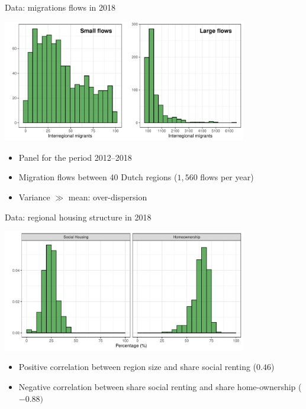 \documentclass{beamer}
\begin{document}
\begin{frame}{Data: migrations flows in 2018}
	\begin{center}
		\includegraphics[width=0.8\textwidth]{../../fig/hist_mig_corop}      
	\end{center}
\begin{itemize}
	\item Panel for the period 2012--2018
	\item Migration flows \alert{between} 40 Dutch regions ($1,560$ flows per year)
	\item Variance $\gg$ mean: \alert{over-dispersion}
\end{itemize}
\end{frame}

\begin{frame}{Data: regional housing structure in 2018}
\begin{center}
	\includegraphics[width=0.8\textwidth]{../../fig/hist_housing}      
\end{center}
\begin{itemize}
	\item Positive correlation between region size and share social renting ($0.46$)
	\item Negative correlation between share social renting and share home-ownership ($-0.88)$
\end{itemize}
\end{frame}
\end{document}
